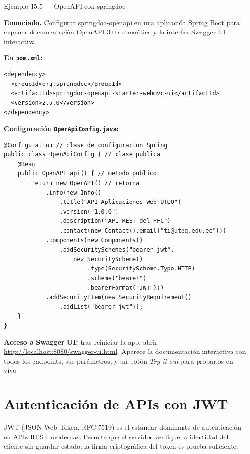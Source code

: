 \begin{cajaejemplo}{Ejemplo 15.5 --- OpenAPI con springdoc}

\textbf{Enunciado.} Configurar springdoc-openapi en una aplicación Spring Boot para exponer documentación OpenAPI 3.0 automática y la interfaz Swagger UI interactiva.

\textbf{En \texttt{pom.xml}:}
\begin{lstlisting}[style=xml,numbers=none,caption={Ejemplo de XML},label=lst:15.8]
<dependency>
  <groupId>org.springdoc</groupId>
  <artifactId>springdoc-openapi-starter-webmvc-ui</artifactId>
  <version>2.6.0</version>
</dependency>
\end{lstlisting}

\textbf{Configuración \texttt{OpenApiConfig.java}:}
\begin{lstlisting}[style=java,numbers=none,caption={Ejemplo de Java},label=lst:15.9]
@Configuration // clase de configuracion Spring
public class OpenApiConfig { // clase publica
    @Bean
    public OpenAPI api() { // metodo publico
        return new OpenAPI() // retorna
            .info(new Info()
                .title("API Aplicaciones Web UTEQ")
                .version("1.0.0")
                .description("API REST del PFC")
                .contact(new Contact().email("ti@uteq.edu.ec")))
            .components(new Components()
                .addSecuritySchemes("bearer-jwt",
                    new SecurityScheme()
                        .type(SecurityScheme.Type.HTTP)
                        .scheme("bearer")
                        .bearerFormat("JWT")))
            .addSecurityItem(new SecurityRequirement()
                .addList("bearer-jwt"));
    }
}
\end{lstlisting}

\textbf{Acceso a Swagger UI:} tras reiniciar la app, abrir
\url{http://localhost:8080/swagger-ui.html}. Aparece la documentación
interactiva con todos los endpoints, sus parámetros, y un botón
\emph{Try it out} para probarlos en vivo.
\end{cajaejemplo}

\section{Autenticación de APIs con JWT}

JWT (JSON Web Token, RFC 7519) es el estándar dominante de
autenticación en APIs REST modernas. Permite que el servidor
verifique la identidad del cliente sin guardar estado: la firma
criptográfica del token es prueba suficiente.


